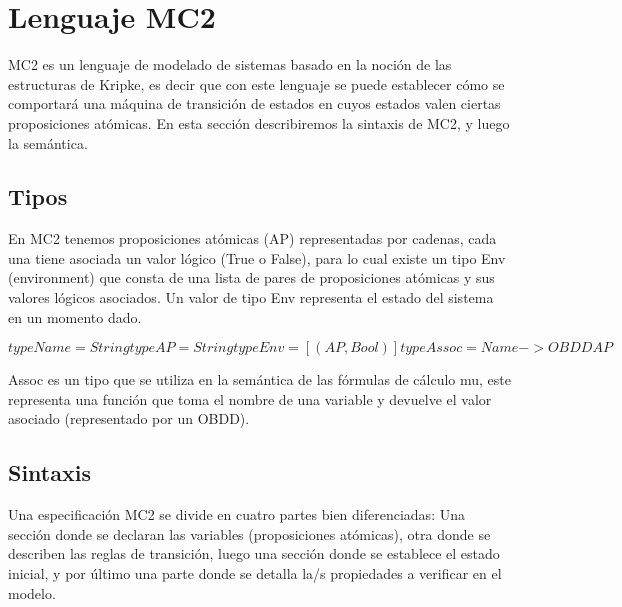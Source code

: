 \chapter{Lenguaje MC2}

MC2 es un lenguaje de modelado de sistemas basado en la noción de las estructuras de Kripke, es decir que con este lenguaje se puede establecer cómo se comportará una máquina de transición de estados en cuyos estados valen ciertas proposiciones atómicas.
En esta sección describiremos la sintaxis de MC2, y luego la semántica.

\section{Tipos}

En MC2 tenemos proposiciones atómicas (AP) representadas por cadenas, cada una tiene asociada un valor lógico (True o False), para lo cual existe un tipo Env (environment) que consta de una lista de pares de proposiciones atómicas y sus valores lógicos asociados. Un valor de tipo Env representa el estado del sistema en un momento dado.

$type Name = String
type AP = String
type Env = [(AP,Bool)]
type Assoc = Name -> OBDD AP$

Assoc es un tipo que se utiliza en la semántica de las fórmulas de cálculo mu, este representa una función que toma el nombre de una variable y devuelve el valor asociado (representado por un OBDD).

\section{Sintaxis}

Una especificación MC2 se divide en cuatro partes bien diferenciadas: Una sección donde se declaran las variables (proposiciones atómicas), otra donde se describen las reglas de transición, luego una sección donde se establece el estado inicial, y por último una parte donde se detalla la/s propiedades a verificar en el modelo.
